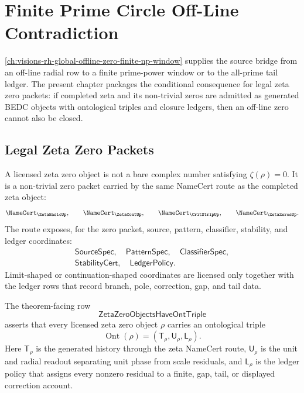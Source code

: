 \chapter{Finite Prime Circle Off-Line Contradiction}
\label{ch:visions-rh-finite-prime-circle-offline-contradiction}

\autoref{ch:visions-rh-global-offline-zero-finite-np-window} supplies the
source bridge from an off-line radial row to a finite prime-power
window or to the all-prime tail ledger.  The present chapter packages
the conditional consequence for legal zeta zero packets: if completed
zeta and its non-trivial zeros are admitted as generated BEDC objects
with ontological triples and closure ledgers, then an off-line zero
cannot also be closed.

\section{Legal Zeta Zero Packets}
\label{sec:rh-prime-circle-legal-zero-packets}

\begin{definition}
\label{def:rh-licensed-zeta-zero-object}
A licensed zeta zero object is not a bare complex number satisfying
$\zeta(\rho)=0$.  It is a non-trivial zero packet carried by the same
NameCert route as the completed zeta object:
$$
\NameCert_{\ZetaBasicUp},
\qquad
\NameCert_{\ZetaContUp},
\qquad
\NameCert_{\CritStripUp},
\qquad
\NameCert_{\ZetaZerosUp}.
$$
The route exposes, for the zero packet, source, pattern, classifier,
stability, and ledger coordinates:
$$
\begin{gathered}
\mathsf{SourceSpec},\quad
\mathsf{PatternSpec},\quad
\mathsf{ClassifierSpec},\\
\mathsf{StabilityCert},\quad
\mathsf{LedgerPolicy}.
\end{gathered}
$$
Limit-shaped or continuation-shaped coordinates are licensed only
together with the ledger rows that record branch, pole, correction,
gap, and tail data.
\end{definition}

\begin{definition}[ZetaZeroObjectsHaveOntTriple]
\label{def:rh-zeta-zero-objects-have-ont-triple}
The theorem-facing row
$$
\mathsf{ZetaZeroObjectsHaveOntTriple}
$$
asserts that every licensed zeta zero object $\rho$ carries an
ontological triple
$$
\operatorname{Ont}(\rho)
=
(\mathsf T_\rho,\mathsf U_\rho,\mathsf L_\rho).
$$
Here $\mathsf T_\rho$ is the generated history through the zeta
NameCert route, $\mathsf U_\rho$ is the unit and radial readout
separating unit phase from scale residuals, and $\mathsf L_\rho$ is the
ledger policy that assigns every nonzero residual to a finite, gap,
tail, or displayed correction account.
\end{definition}

